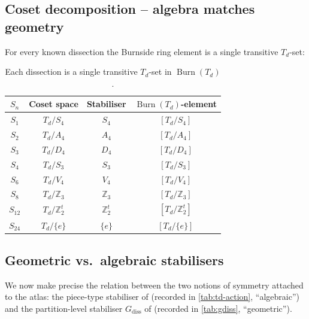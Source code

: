 \documentclass[11pt,a4paper]{article}
\theoremstyle{plain}
\theoremstyle{definition}
\theoremstyle{remark}
\DeclareMathOperator{\Burn}{Burn}
\newcommand{\Td}{T_{\!d}}
\newcommand{\Z}{\mathbb{Z}}
\begin{document}
\subsection{Coset decomposition -- algebra matches geometry}

For every known dissection the Burnside ring element is a single transitive
$\Td$-set:

\begin{table}[H]
\centering\small
\caption{Each dissection is a single transitive $\Td$-set in $\Burn(\Td)$.}
\label{tab:coset-match}
\begin{tabular}{@{}c c c c @{}}
\toprule
$S_{n}$ & Coset space & Stabiliser & $\Burn(\Td)$-element \\
\midrule
$S_{1}$  & $\Td/S_{4}$        & $S_{4}$        & $[\Td/S_{4}]$        \\
$S_{2}$  & $\Td/A_{4}$        & $A_{4}$        & $[\Td/A_{4}]$        \\
$S_{3}$  & $\Td/D_{4}$        & $D_{4}$        & $[\Td/D_{4}]$        \\
$S_{4}$  & $\Td/S_{3}$        & $S_{3}$        & $[\Td/S_{3}]$        \\
$S_{6}$  & $\Td/V_{4}$        & $V_{4}$        & $[\Td/V_{4}]$        \\
$S_{8}$  & $\Td/\Z_{3}$       & $\Z_{3}$       & $[\Td/\Z_{3}]$       \\
$S_{12}$ & $\Td/\Z_{2}^{t}$   & $\Z_{2}^{t}$   & $[\Td/\Z_{2}^{t}]$   \\
$S_{24}$ & $\Td/\{e\}$        & $\{e\}$        & $[\Td/\{e\}]$        \\
\bottomrule
\end{tabular}
\end{table}

\subsection{Geometric vs.\ algebraic stabilisers}\label{ssec:geom-vs-alg}

We now make precise the relation between the two notions of
symmetry attached to the atlas: the piece-type stabiliser of
 (recorded in \cref{tab:td-action}, ``algebraic'')
and the partition-level stabiliser $G_{\mathrm{diss}}$ of
 (recorded in \cref{tab:gdiss}, ``geometric'').
\end{document}
